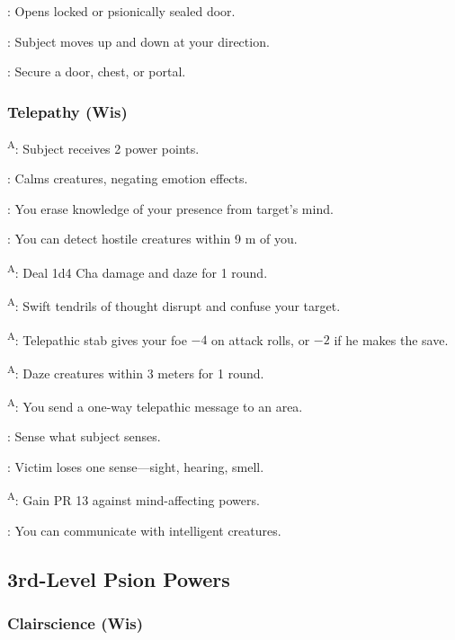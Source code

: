 : Opens locked or psionically sealed door.

: Subject moves up and down at your direction.

: Secure a door, chest, or portal.


\subsubsection{Telepathy (Wis)}

\textsuperscript{A}: Subject receives 2 power points.

: Calms creatures, negating emotion effects.

: You erase knowledge of your presence from target's mind.

: You can detect hostile creatures within 9 m of you.

\textsuperscript{A}: Deal 1d4 Cha damage and daze for 1 round.

\textsuperscript{A}: Swift tendrils of thought disrupt and confuse your target.

\textsuperscript{A}: Telepathic stab gives your foe $-4$ on attack rolls, or $-2$ if he makes the save.

\textsuperscript{A}: Daze creatures within 3 meters for 1 round.

\textsuperscript{A}: You send a one-way telepathic message to an area.

: Sense what subject senses.

: Victim loses one sense---sight, hearing, smell.

\textsuperscript{A}: Gain PR 13 against mind-affecting powers.

: You can communicate with intelligent creatures.



\subsection{3rd-Level Psion Powers}


\subsubsection{Clairscience (Wis)}

